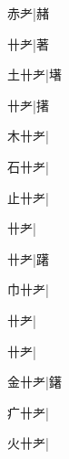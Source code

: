 \begin{multicols}{2}
{{\cjk{}{\cnsym{}　}赤耂}\mktsJzrVerticalBar{}{\cjk{}{\cnsym{}　}{\cnsym{}　}{\cnsym{}　}}|{\cjk{}赭}\par
{\cjk{}{\cnsym{}　}卄耂}\mktsJzrVerticalBar{}{\cjk{}{\cnsym{}　}{\cnsym{}　}{\cnsym{}　}}|{\cjk{}著}\par
{\cjk{}土卄耂}\mktsJzrVerticalBar{}{\cjk{}{\cnsym{}　}{\cnsym{}　}{\cnsym{}　}}|{\cjk{}墸}\par
{卄耂}\mktsJzrVerticalBar{}{\cjk{}{\cnsym{}　}{\cnsym{}　}{\cnsym{}　}}|{\cjk{}擆}\par
{\cjk{}木卄耂}\mktsJzrVerticalBar{}{\cjk{}{\cnsym{}　}{\cnsym{}　}{\cnsym{}　}}|{}\par
{\cjk{}石卄耂}\mktsJzrVerticalBar{}{\cjk{}{\cnsym{}　}{\cnsym{}　}{\cnsym{}　}}|{}\par
{\cjk{}止卄耂}\mktsJzrVerticalBar{}{\cjk{}{\cnsym{}　}{\cnsym{}　}{\cnsym{}　}}|{}\par
{卄耂}\mktsJzrVerticalBar{}{\cjk{}{\cnsym{}　}{\cnsym{}　}{\cnsym{}　}}|{}\par
{卄耂}\mktsJzrVerticalBar{}{\cjk{}{\cnsym{}　}{\cnsym{}　}{\cnsym{}　}}|{\cjk{}躇}\par
{\cjk{}巾卄耂}\mktsJzrVerticalBar{}{\cjk{}{\cnsym{}　}{\cnsym{}　}{\cnsym{}　}}|{}\par
{卄耂}\mktsJzrVerticalBar{}{\cjk{}{\cnsym{}　}{\cnsym{}　}{\cnsym{}　}}|{}\par
{卄耂}\mktsJzrVerticalBar{}{\cjk{}{\cnsym{}　}{\cnsym{}　}{\cnsym{}　}}|{}\par
{\cjk{}金卄耂}\mktsJzrVerticalBar{}{\cjk{}{\cnsym{}　}{\cnsym{}　}{\cnsym{}　}}|{\cjk{}鐯}\par
{\cjk{}疒卄耂}\mktsJzrVerticalBar{}{\cjk{}{\cnsym{}　}{\cnsym{}　}{\cnsym{}　}}|{}\par
{\cjk{}火卄耂}\mktsJzrVerticalBar{}{\cjk{}{\cnsym{}　}{\cnsym{}　}{\cnsym{}　}}|{}\par
}
\end{multicols}
